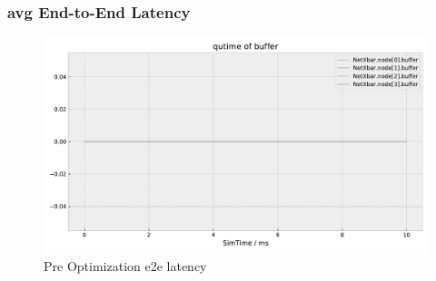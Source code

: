 \documentclass[]{scrartcl}
\begin{document}
    \subsubsection{avg End-to-End Latency}
    \begin{figure}[ht]
        \centering
        \includegraphics[width=\columnwidth, page=8]{../../python/results/preopt-General-0}
        \caption{Pre Optimization e2e latency}%
        \label{fig:preopt-2e2}
    \end{figure}
\end{document}
